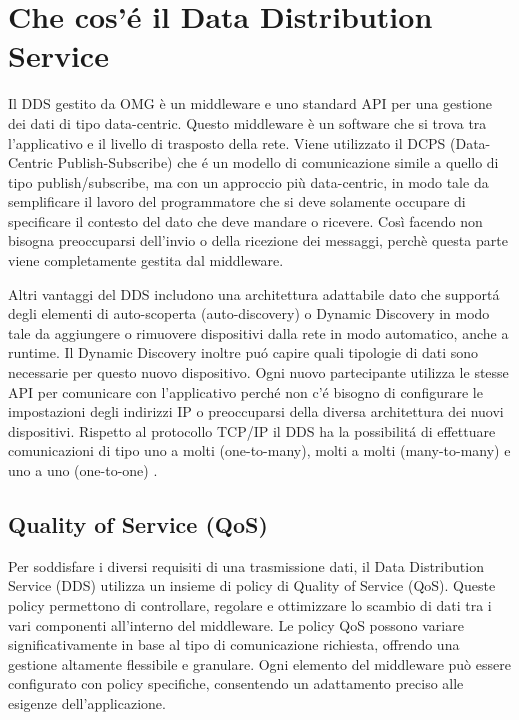\section{Che cos'é il Data Distribution Service}

Il DDS gestito da OMG è un middleware e uno standard API per una gestione
dei dati di tipo data-centric. Questo middleware è un software che si trova
tra l'applicativo e il livello di trasposto della rete. 
Viene utilizzato il DCPS (Data-Centric Publish-Subscribe) 
che é un modello di comunicazione simile a quello
di tipo publish/subscribe, ma con un approccio più data-centric, in modo
tale da semplificare il lavoro del programmatore che si deve solamente
occupare di specificare il contesto del dato che deve mandare o ricevere.
Così facendo non bisogna preoccuparsi dell'invio o della ricezione
dei messaggi, perchè questa parte viene completamente gestita dal middleware.


Altri vantaggi del DDS includono una architettura adattabile dato che supportá
degli elementi di auto-scoperta (auto-discovery) o Dynamic Discovery 
in modo tale da aggiungere o 
rimuovere dispositivi dalla rete in modo automatico, anche a runtime.
Il Dynamic Discovery inoltre puó capire quali tipologie di dati sono 
necessarie per questo nuovo dispositivo. Ogni nuovo partecipante 
utilizza le stesse API per comunicare con l'applicativo perché 
non c'é bisogno di configurare le impostazioni degli indirizzi IP o 
preoccuparsi della diversa architettura dei nuovi dispositivi.
Rispetto al protocollo TCP/IP 
il DDS ha la possibilitá di effettuare comunicazioni di tipo uno a molti 
(one-to-many), molti a molti (many-to-many) e uno a uno (one-to-one)
 \cite{1494965}.
 
 
 \subsection{Quality of Service (QoS)}

 Per soddisfare i diversi requisiti di una trasmissione dati, 
 il Data Distribution Service (DDS) utilizza un insieme di policy di 
 Quality of Service (QoS). Queste policy permettono di controllare, 
 regolare e ottimizzare lo scambio di dati tra i vari componenti 
 all'interno del middleware. Le policy QoS possono variare 
 significativamente in base al tipo di comunicazione richiesta, 
 offrendo una gestione altamente flessibile e granulare. 
 Ogni elemento del middleware può essere configurato 
 con policy specifiche, consentendo un adattamento preciso alle 
 esigenze dell'applicazione.

